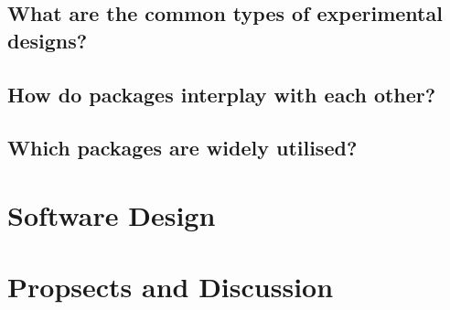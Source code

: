 \hypertarget{what-are-the-common-types-of-experimental-designs}{%
\subsection{What are the common types of experimental
designs?}\label{what-are-the-common-types-of-experimental-designs}}

\hypertarget{how-do-packages-interplay-with-each-other}{%
\subsection{How do packages interplay with each
other?}\label{how-do-packages-interplay-with-each-other}}

\hypertarget{which-packages-are-widely-utilised}{%
\subsection{Which packages are widely
utilised?}\label{which-packages-are-widely-utilised}}

\hypertarget{software-design}{%
\section{Software Design}\label{software-design}}

\hypertarget{propsects-and-discussion}{%
\section{Propsects and Discussion}\label{propsects-and-discussion}}

\newpage

